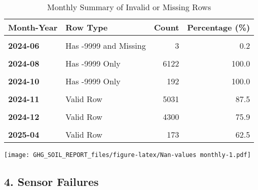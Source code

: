 \documentclass[
]{article}
\begin{document}
\begin{longtable}[t]{>{}llrr}
\caption{\label{tab:Nan-values monthly}Monthly Summary of Invalid or Missing Rows}\\
\toprule
Month-Year & Row Type & Count & Percentage (\%)\\
\midrule
\textbf{\cellcolor{gray!10}{2024-06}} & \cellcolor{gray!10}{Has -9999 Only} & \cellcolor{gray!10}{1958} & \cellcolor{gray!10}{99.8}\\
\textbf{2024-06} & Has -9999 and Missing & 3 & 0.2\\
\textbf{\cellcolor{gray!10}{2024-07}} & \cellcolor{gray!10}{Has -9999 Only} & \cellcolor{gray!10}{6557} & \cellcolor{gray!10}{100.0}\\
\textbf{2024-08} & Has -9999 Only & 6122 & 100.0\\
\textbf{\cellcolor{gray!10}{2024-09}} & \cellcolor{gray!10}{Has -9999 Only} & \cellcolor{gray!10}{4396} & \cellcolor{gray!10}{100.0}\\
\addlinespace
\textbf{2024-10} & Has -9999 Only & 192 & 100.0\\
\textbf{\cellcolor{gray!10}{2024-11}} & \cellcolor{gray!10}{Has -9999 Only} & \cellcolor{gray!10}{721} & \cellcolor{gray!10}{12.5}\\
\textbf{2024-11} & Valid Row & 5031 & 87.5\\
\textbf{\cellcolor{gray!10}{2024-12}} & \cellcolor{gray!10}{Has -9999 Only} & \cellcolor{gray!10}{1366} & \cellcolor{gray!10}{24.1}\\
\textbf{2024-12} & Valid Row & 4300 & 75.9\\
\addlinespace
\textbf{\cellcolor{gray!10}{2025-04}} & \cellcolor{gray!10}{Has -9999 Only} & \cellcolor{gray!10}{104} & \cellcolor{gray!10}{37.5}\\
\textbf{2025-04} & Valid Row & 173 & 62.5\\
\bottomrule
\end{longtable}

\texttt{[image: GHG\_SOIL\_REPORT\_files/figure-latex/Nan-values monthly-1.pdf]}

\hypertarget{sensor-failures}{%
\subsection{4. Sensor Failures}\label{sensor-failures}}
\end{document}
